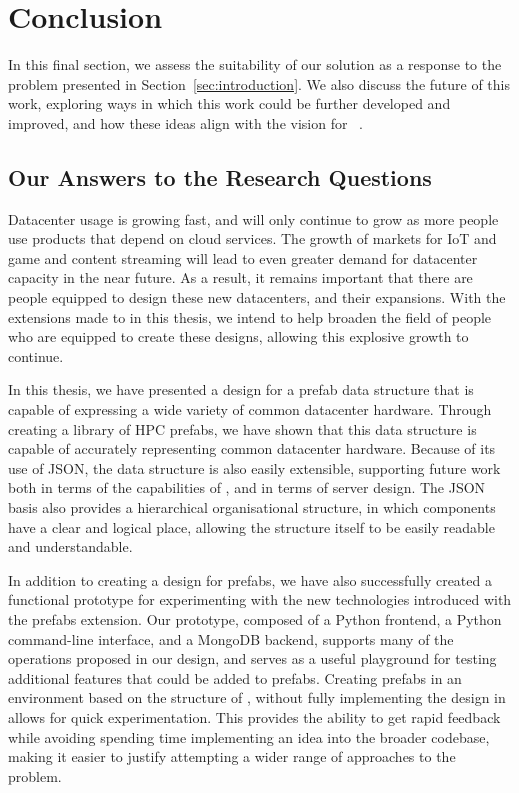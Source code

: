 \documentclass[11pt]{article}
\begin{document}
\newpage

\section{Conclusion} \label{sec:conclusion}
	In this final section, we assess the suitability of our solution as a response to the problem presented in Section~\ref{sec:introduction}.
	We also discuss the future of this work, exploring ways in which this work could be further developed and improved, and how these ideas align with the vision for \opendc{}~\cite{Iosup2017}.

	\subsection{Our Answers to the Research Questions}
		Datacenter usage is growing fast, and will only continue to grow as more people use products that depend on cloud services.
		The growth of markets for IoT and game and content streaming will lead to even greater demand for datacenter capacity in the near future.
		As a result, it remains important that there are people equipped to design these new datacenters, and their expansions.
		With the extensions made to \opendc{} in this thesis, we intend to help broaden the field of people who are equipped to create these designs, allowing this explosive growth to continue.

		In this thesis, we have presented a design for a prefab data structure that is capable of expressing a wide variety of common datacenter hardware.
		Through creating a library of HPC prefabs, we have shown that this data structure is capable of accurately representing common datacenter hardware.
		Because of its use of JSON, the data structure is also easily extensible, supporting future work both in terms of the capabilities of \opendc{}, and in terms of server design.
		The JSON basis also provides a hierarchical organisational structure, in which components have a clear and logical place, allowing the structure itself to be easily readable and understandable.
		
		In addition to creating a design for prefabs, we have also successfully created a functional prototype for experimenting with the new technologies introduced with the prefabs extension.
		Our prototype, composed of a Python frontend, a Python command-line interface, and a MongoDB backend, supports many of the operations proposed in our design, and serves as a useful playground for testing additional features that could be added to prefabs.
		Creating prefabs in an environment based on the structure of \opendc{}, without fully implementing the design in \opendc{} allows for quick experimentation.
		This provides the ability to get rapid feedback while avoiding spending time implementing an idea into the broader \opendc{} codebase, making it easier to justify attempting a wider range of approaches to the problem.
\end{document}
